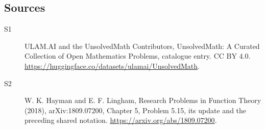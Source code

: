 \documentclass[11pt]{article}
\begin{document}
\subsection{Sources}
\begin{description}
\item[\hypertarget{source:statement:1}{S1}] ULAM.AI and the UnsolvedMath Contributors, UnsolvedMath: A Curated Collection of Open Mathematics Problems, catalogue entry. CC BY 4.0. \url{https://huggingface.co/datasets/ulamai/UnsolvedMath}.
\item[\hypertarget{source:statement:2}{S2}] W. K. Hayman and E. F. Lingham, Research Problems in Function Theory (2018), arXiv:1809.07200, Chapter 5, Problem 5.15, its update and the preceding shared notation. \url{https://arxiv.org/abs/1809.07200}.
\end{description}
\label{end:statement}
\end{document}
